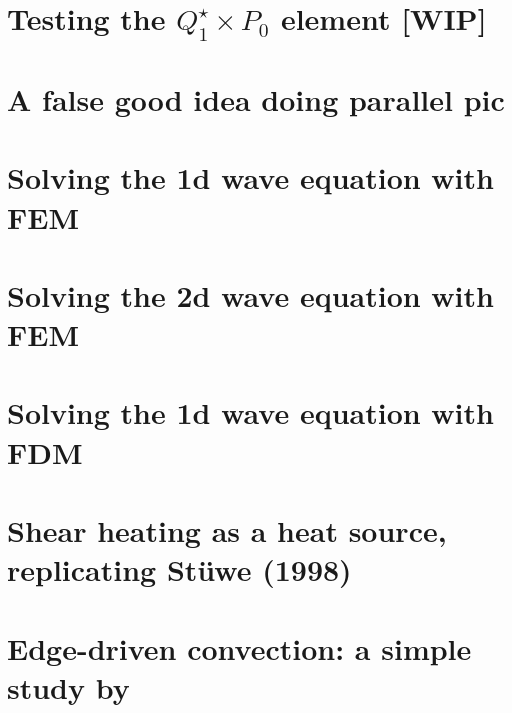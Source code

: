 \documentclass[a4paper,11pt]{report}
\begin{document}
\chapter{Testing the $Q_1^\star \times P_0$ element [WIP] \label{f162}} %

\chapter{A false good idea doing parallel pic \label{f163}} %

\chapter{Solving the 1d wave equation with FEM \label{f164}} %

\chapter{Solving the 2d wave equation with FEM \label{f165}} %

\chapter{Solving the 1d wave equation with FDM \label{f166}} %

\chapter{Shear heating as a heat source, replicating St{\"u}we (1998) \label{f167}} %

\chapter{Edge-driven convection: a simple study by \textcite{kiso20} \label{f168}} %
\end{document}
